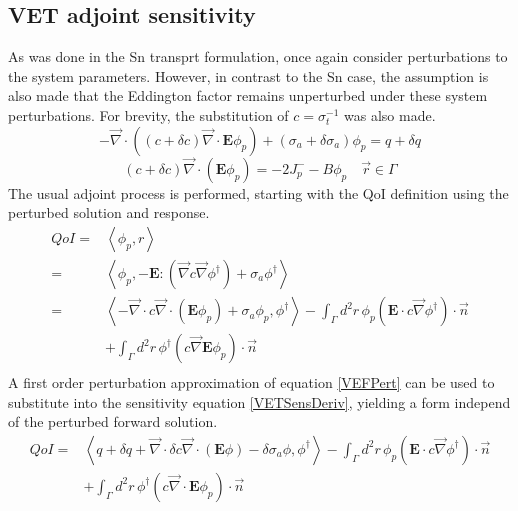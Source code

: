 \documentclass{article}
\newcommand{\vr}{\vec{r}}
\newcommand{\bra}{\left\langle}
\newcommand{\ket}{\right\rangle}
\newcommand{\vdiv}{\vec{\nabla} \cdot}
\newcommand{\vgrad}{\vec{\nabla}}
\newcommand{\Edd}{\mathbf{E}}
\newcommand{\sigt}{\sigma_t}
\newcommand{\siga}{\sigma_a}
\newcommand{\isigt}{c}
\newcommand{\scalSource}{q}
\newcommand{\scalResp}{r}
\begin{document}
\subsection{VET adjoint sensitivity}
As was done in the Sn transprt formulation, once again consider perturbations to the system parameters. However, in contrast to the Sn case, the assumption is also made that the Eddington factor remains unperturbed under these system perturbations. For brevity, the substitution of $\isigt = \sigt^{-1}$ was also made.
\begin{equation}
\label{VEFPert}
- \vdiv \left((\isigt + \delta \isigt)\vdiv \Edd \phi_p \right) + (\siga + \delta \siga)\phi_p = \scalSource + \delta \scalSource
\end{equation}
\begin{equation}
(\isigt + \delta \isigt) \vec{\nabla} \cdot \left(\Edd \phi_p \right)  = - 2J_p^- - B \phi_p \quad \vr \in \Gamma
\end{equation}
The usual adjoint process is performed, starting with the QoI definition using the perturbed solution and response. 
\begin{equation}
\label{VETSensDeriv}
\begin{split}
QoI=&\bra \phi_p , \scalResp \ket \\
=&\bra \phi_p , - \Edd : \left( \vgrad \isigt \vgrad \phi^\dag \right) + \siga \phi^\dag \ket \\
=& \bra - \vdiv \isigt \vdiv \left( \Edd \phi_p \right) + \siga \phi_p, \phi^\dag \ket 
- \int_\Gamma d^2 r \, \phi_p \left( \Edd \cdot \isigt \vgrad \phi^\dag \right) \cdot \vec{n}  \\ 
&+ \int_\Gamma d^2 r \, \phi^\dag \left(  \isigt \vgrad \Edd \phi_p \right) \cdot \vec{n} \\
\end{split}
\end{equation}
A first order perturbation approximation of equation \ref{VEFPert} can be used to substitute into the sensitivity equation \ref{VETSensDeriv}, yielding a form independ of the perturbed forward solution.
\begin{equation}
\label{QoIVETAdjNoBC}
\begin{split}
QoI =& \bra \scalSource + \delta \scalSource + \vdiv \delta \isigt \vdiv \left( \Edd \phi \right) - \delta \siga \phi, \phi^\dag \ket - \int_\Gamma d^2 r \, \phi_p \left( \Edd \cdot \isigt \vgrad \phi^\dag \right) \cdot \vec{n} 
\\ &+ \int_\Gamma d^2 r \, \phi^\dag \left(  \isigt \vdiv \Edd \phi_p \right) \cdot \vec{n} 
\end{split}
\end{equation}
\end{document}
